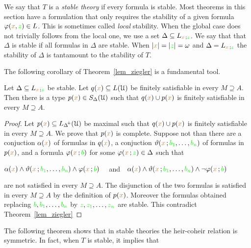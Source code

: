 \def\ceq#1#2#3{\parbox{20ex}{$\displaystyle #1$}\medrel{#2}$\displaystyle  #3$}

We say that $T$ is a \emph{stable theory\/} if every formula is stable.
Most theorems in this section have a formulation that only requires the stability of a given formula $\varphi({\color{brown} x},{\color{green} z})\in L$.
This is sometimes called \textit{local\/} stability.
When the global case does not trivially follows from the local one, we use a set $\Delta\subseteq L_{{\color{brown} x}\,;{\color{green} z}}$.
We say that that $\Delta$ is stable if all formulas in $\Delta$ are stable.
When $|{\color{brown} x}|=|{\color{green} z}|=\omega$ and $\Delta=L_{{\color{brown} x}\,;{\color{green} z}}$ the stability of $\Delta$ is tantamount to the stability of $T$.

The following corollary of Theorem~\ref{lem_ziegler} is a fundamental tool.

\begin{corollary}\label{corol_stable_coheir_over_models}
  Let  $\Delta\subseteq L_{{\color{brown} x}\,;{\color{green} z}}$ be stable.
  Let $q({\color{brown} x})\subseteq L(\EuScript U)$ be finitely satisfiable in every $M\supseteq A$.
  Then there is a type $p({\color{brown} x})\in S_\Delta(\EuScript U)$ such that $q({\color{brown} x})\cup p({\color{brown} x})$ is finitely satisfiable in every $M\supseteq A$.
\end{corollary}

\begin{proof}
  Let $p({\mr x})\subseteq L_{\pmDelta}(\U)$ be maximal such that $q({\color{brown} x})\cup p({\color{brown} x})$ is finitely satisfiable in every $M\supseteq A$.
  We prove that $p({\color{brown} x})$ is complete.
  Suppose not than there are a conjuction $\alpha({\color{brown} x})$ of formulas in $q({\color{brown} x})$, a conjuction $\vartheta({\color{brown} x}\,;{\color{green} b_1},\dots,{\color{green} b_n})$ of formulas in $p({\color{brown} x})$, and a formula $\varphi({\color{brown} x}\,;{\color{green} b})$ for some $\varphi({\color{brown} x}\,;{\color{green} z})\in\Delta$ such that 

  \hfil$\alpha({\color{brown} x})\wedge\vartheta({\color{brown} x}\,;{\color{green} b_1},\dots,{\color{green} b_n})\wedge\varphi({\color{brown} x}\,;{\color{green} b})$ \ \ and\ \   $\alpha({\color{brown} x})\wedge\vartheta({\color{brown} x}\,;{\color{green} b_1},\dots,{\color{green} b_n})\wedge\neg\varphi({\color{brown} x}\,;{\color{green} b})$ 
 
  are not satisfied in every $M\supseteq A$.
  The disjunction of the two formulas is satisfied in every $M\supseteq A$ by the definition of $p({\color{brown} x})$.
  Moreover the formulas obtained replacing ${\color{green} b},{\color{green} b_1},\dots,{\color{green} b_n}$ by ${\color{green} z},{\color{green} z_1},\dots,{\color{green} z_n}$ are stable.
  This contradict Theorem~\ref{lem_ziegler}
\end{proof}

The following theorem shows that in stable theories the heir-coheir relation is symmetric.
In fact, when $T$ is stable, it implies that

